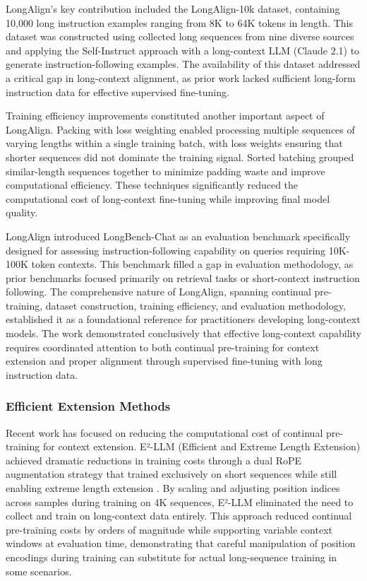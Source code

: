 LongAlign's key contribution included the LongAlign-10k dataset, containing 10,000 long instruction examples ranging from 8K to 64K tokens in length. This dataset was constructed using collected long sequences from nine diverse sources and applying the Self-Instruct approach with a long-context LLM (Claude 2.1) to generate instruction-following examples. The availability of this dataset addressed a critical gap in long-context alignment, as prior work lacked sufficient long-form instruction data for effective supervised fine-tuning.

Training efficiency improvements constituted another important aspect of LongAlign. Packing with loss weighting enabled processing multiple sequences of varying lengths within a single training batch, with loss weights ensuring that shorter sequences did not dominate the training signal. Sorted batching grouped similar-length sequences together to minimize padding waste and improve computational efficiency. These techniques significantly reduced the computational cost of long-context fine-tuning while improving final model quality.

LongAlign introduced LongBench-Chat as an evaluation benchmark specifically designed for assessing instruction-following capability on queries requiring 10K-100K token contexts. This benchmark filled a gap in evaluation methodology, as prior benchmarks focused primarily on retrieval tasks or short-context instruction following. The comprehensive nature of LongAlign, spanning continual pre-training, dataset construction, training efficiency, and evaluation methodology, established it as a foundational reference for practitioners developing long-context models. The work demonstrated conclusively that effective long-context capability requires coordinated attention to both continual pre-training for context extension and proper alignment through supervised fine-tuning with long instruction data.

\subsubsection{Efficient Extension Methods}

Recent work has focused on reducing the computational cost of continual pre-training for context extension. E²-LLM (Efficient and Extreme Length Extension) achieved dramatic reductions in training costs through a dual RoPE augmentation strategy that trained exclusively on short sequences while still enabling extreme length extension \citep{xnhyacinth2024e2llm}. By scaling and adjusting position indices across samples during training on 4K sequences, E²-LLM eliminated the need to collect and train on long-context data entirely. This approach reduced continual pre-training costs by orders of magnitude while supporting variable context windows at evaluation time, demonstrating that careful manipulation of position encodings during training can substitute for actual long-sequence training in some scenarios.

